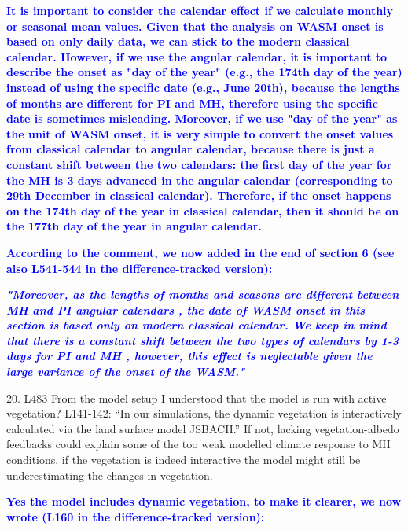 \documentclass[gmd, manuscript]{copernicus}
\begin{document}
\medskip

\textcolor{blue}{\textbf{It is important to consider the calendar effect if we calculate monthly or seasonal mean values. Given that the analysis on WASM onset is based on only daily data, we can stick to the modern classical calendar. However, if we use the angular calendar, it is important to describe the onset as "day of the year" (e.g., the 174th day of the year) instead of using the specific date (e.g., June 20th), because the lengths of months are different for PI and MH, therefore using the specific date is sometimes misleading. Moreover, if we use  "day of the year" as the unit of WASM onset, it is very simple to convert the onset values from classical calendar to angular calendar, because there is just a constant shift between the two calendars: the first day of the year for the MH is 3 days advanced in the angular calendar (corresponding to 29th December in classical calendar). Therefore, if the onset happens on the 174th day of the year in classical calendar, then it should be on the 177th day of the year in angular calendar.}}

\medskip
\textcolor{blue}{\textbf{According to the comment, we now added in the end of section 6 (see also L541-544 in the difference-tracked version):}}

\textcolor{blue}{\textbf{\textit{"Moreover, as the lengths of months and seasons are different between MH and PI angular calendars \citep{shi2022calendar},  the date of WASM onset in this section is based only on modern classical calendar. We keep in mind that there is a constant shift between the two types of calendars by 1-3 days for PI and MH \citep{shi2022calendar},  however, this effect is neglectable given the large variance of the onset of the WASM."}}}


\medskip

20. L483 From the model setup I understood that the model is run with active vegetation? L141-142: “In our simulations, the dynamic vegetation is interactively calculated via the land surface model JSBACH.” If not, lacking vegetation-albedo feedbacks could explain some of the too weak modelled climate response to MH conditions, if the vegetation is indeed interactive the model might still be underestimating the changes in vegetation.

\medskip

\textcolor{blue}{\textbf{Yes the model includes dynamic vegetation, to make it clearer, we now wrote  (L160 in the difference-tracked version):}}
\end{document}
